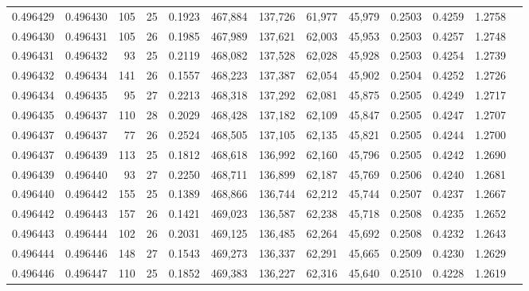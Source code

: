 \begin{tabular}{rrrrrrrrrrrrr}
0.496429 & 0.496430 & 105 &  25 &                                     0.1923 & 467,884 & 137,726 &  61,977 &  45,979 & 0.2503 & 0.4259 & 1.2758 \\
0.496430 & 0.496431 & 105 &  26 &                                     0.1985 & 467,989 & 137,621 &  62,003 &  45,953 & 0.2503 & 0.4257 & 1.2748 \\
0.496431 & 0.496432 &  93 &  25 &                                     0.2119 & 468,082 & 137,528 &  62,028 &  45,928 & 0.2503 & 0.4254 & 1.2739 \\
0.496432 & 0.496434 & 141 &  26 &                                     0.1557 & 468,223 & 137,387 &  62,054 &  45,902 & 0.2504 & 0.4252 & 1.2726 \\
0.496434 & 0.496435 &  95 &  27 &                                     0.2213 & 468,318 & 137,292 &  62,081 &  45,875 & 0.2505 & 0.4249 & 1.2717 \\
0.496435 & 0.496437 & 110 &  28 &                                     0.2029 & 468,428 & 137,182 &  62,109 &  45,847 & 0.2505 & 0.4247 & 1.2707 \\
0.496437 & 0.496437 &  77 &  26 &                                     0.2524 & 468,505 & 137,105 &  62,135 &  45,821 & 0.2505 & 0.4244 & 1.2700 \\
0.496437 & 0.496439 & 113 &  25 &                                     0.1812 & 468,618 & 136,992 &  62,160 &  45,796 & 0.2505 & 0.4242 & 1.2690 \\
0.496439 & 0.496440 &  93 &  27 &                                     0.2250 & 468,711 & 136,899 &  62,187 &  45,769 & 0.2506 & 0.4240 & 1.2681 \\
0.496440 & 0.496442 & 155 &  25 &                                     0.1389 & 468,866 & 136,744 &  62,212 &  45,744 & 0.2507 & 0.4237 & 1.2667 \\
0.496442 & 0.496443 & 157 &  26 &                                     0.1421 & 469,023 & 136,587 &  62,238 &  45,718 & 0.2508 & 0.4235 & 1.2652 \\
0.496443 & 0.496444 & 102 &  26 &                                     0.2031 & 469,125 & 136,485 &  62,264 &  45,692 & 0.2508 & 0.4232 & 1.2643 \\
0.496444 & 0.496446 & 148 &  27 &                                     0.1543 & 469,273 & 136,337 &  62,291 &  45,665 & 0.2509 & 0.4230 & 1.2629 \\
0.496446 & 0.496447 & 110 &  25 &                                     0.1852 & 469,383 & 136,227 &  62,316 &  45,640 & 0.2510 & 0.4228 & 1.2619 \\

\end{tabular}
